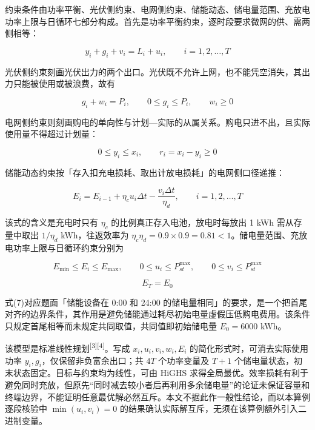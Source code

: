 \documentclass[12pt,a4paper]{ctexart}
\begin{document}
约束条件由功率平衡、光伏侧约束、电网侧约束、储能动态、储电量范围、充放电功率上限与日循环七部分构成。首先是功率平衡约束，逐时段要求微网的供、需两侧相等：

\begin{equation}
y_i+g_i+v_i=L_i+u_i,\qquad i=1,2,\dots,T
\end{equation}

光伏侧约束刻画光伏出力的两个出口。光伏既不允许上网，也不能凭空消失，其出力只能被使用或被浪费，故有

\begin{equation}
g_i+w_i=P_i,\qquad 0\le g_i\le P_i,\qquad w_i\ge0
\end{equation}

电网侧约束则刻画购电的单向性与计划—实际的从属关系。购电只进不出，且实际使用量不得超过计划量：

\begin{equation}
0\le y_i\le x_i,\qquad r_i=x_i-y_i\ge0
\end{equation}

储能动态约束按「存入扣充电损耗、取出计放电损耗」的电网侧口径递推：

\begin{equation}
E_i=E_{i-1}+\eta_c u_i \Delta t-\frac{v_i \Delta t}{\eta_d},\qquad i=1,2,\dots,T
\end{equation}

该式的含义是充电时只有 $\eta_c$ 的比例真正存入电池，放电时每放出 1 kWh 需从存量中取出 $1/\eta_d$ kWh，往返效率为 $\eta_c\eta_d=0.9\times0.9=0.81<1$。储电量范围、充放电功率上限与日循环约束分别为

\begin{equation}
E_{\min}\le E_i\le E_{\max},\qquad 0\le u_i\le P_{st}^{\max},\qquad 0\le v_i\le P_{st}^{\max}
\end{equation}

\begin{equation}
E_T=E_0
\end{equation}

式(7)对应题面「储能设备在 0:00 和 24:00 的储电量相同」的要求，是一个把首尾对齐的边界条件，其作用是避免储能通过耗尽初始电量虚假压低购电费用。该条件只规定首尾相等而未规定共同取值，共同值即初始储电量 $E_0=6000$ kWh。

该模型是标准线性规划\textsuperscript{[3]}\textsuperscript{[4]}。写成 $x_i,u_i,v_i,w_i,E_i$ 的简化形式时，可消去实际使用功率 $y_i,g_i$，仅保留非负富余出口；共 $4T$ 个功率变量及 $T+1$ 个储电量状态，初末状态固定。目标与约束均为线性，可由 HiGHS 求得全局最优。效率损耗有利于避免同时充放，但原先``同时减去较小者后再利用多余储电量''的论证未保证容量和终端边界，不能证明任意最优解必然互斥。本文不据此作一般性结论，而以本算例逐段核验中 $\min(u_i,v_i)=0$ 的结果确认实际解互斥，无须在该算例额外引入二进制变量。
\end{document}
